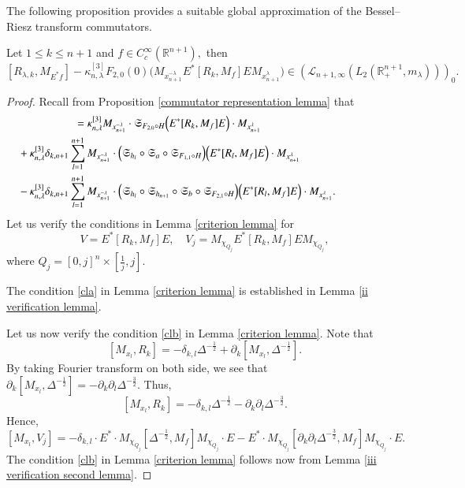 \documentclass[12pt]{amsart}
\begin{document}
The following proposition provides a suitable global approximation of the Bessel--Riesz transform commutators.
\begin{proposition}\label{first approximate lemma} Let $1\leq k\leq n+1$ and $f\in C^{\infty}_c(\mathbb{R}^{n+1}),$ then
$$[R_{\lambda,k},M_{E^{\ast}f}]-\kappa_{n,\lambda}^{[3]}F_{2,0}(0)\Big( M_{x_{n+1}^{-\lambda}} E^{\ast}[R_k,M_f]E M_{x_{n+1}^{\lambda}}\Big)\in (\mathcal{L}_{n+1,\infty}(L_2(\mathbb{R}^{n+1}_+,m_{\lambda})))_0.$$
\end{proposition}
\begin{proof} Recall from Proposition \ref{commutator representation lemma} that
\begin{align*}
[R_{\lambda,k},M_{E^{\ast}f}]&=\kappa_{n,\lambda}^{[3]}M_{x_{n+1}^{-\lambda}}\cdot\mathfrak{S}_{F_{2,0}\circ H}\Big(  E^{\ast}[R_k,M_{f}]E\Big)\cdot  M_{x_{n+1}^{\lambda}}\\
&\hspace{-1.8cm}+\kappa_{n,\lambda}^{[3]}\delta_{k,n+1}\sum_{l=1}^{n+1}M_{x_{n+1}^{-\lambda}} \cdot \Big(\mathfrak{S}_{h_l}\circ\mathfrak{S}_a\circ\mathfrak{S}_{F_{1,1}\circ H}\Big)\Big(E^{\ast}[R_l,M_{f}]E \Big)\cdot M_{x_{n+1}^{\lambda}}\\
&\hspace{-1.8cm}-\kappa_{n,\lambda}^{[3]}\delta_{k,n+1}\sum_{l=1}^{n+1} M_{x_{n+1}^{-\lambda}}\cdot\Big(\mathfrak{S}_{h_l}\circ\mathfrak{S}_{h_{n+1}}\circ\mathfrak{S}_b\circ\mathfrak{S}_{F_{2,1}\circ H}\Big)\Big( E^{\ast}[R_l,M_{f}]E\Big)\cdot  M_{x_{n+1}^{\lambda}}.
\end{align*}
Let us verify the conditions in Lemma \ref{criterion lemma} for
$$V=E^{\ast}[R_k,M_f]E,\quad V_j=M_{\chi_{Q_j}}E^{\ast}[R_k,M_f]EM_{\chi_{Q_j}},$$
where $Q_j=[0,j]^n\times[\frac1j,j].$

The condition \eqref{cla} in Lemma \ref{criterion lemma} is established in Lemma \ref{ii verification lemma}.

Let us now verify the condition \eqref{clb} in Lemma \ref{criterion lemma}. Note that
$$[M_{x_l},R_k]=-\delta_{k,l}\Delta^{-\frac12}+\partial_k[M_{x_l},\Delta^{-\frac12}].$$
By taking Fourier transform on both side, we see that $\partial_k[M_{x_l},\Delta^{-\frac12}]=-\partial_k\partial_l\Delta^{-\frac32}.$ Thus,
$$[M_{x_l},R_k]=-\delta_{k,l}\Delta^{-\frac12}-\partial_k\partial_l\Delta^{-\frac32}.$$
Hence,
$$[M_{x_l},V_j]=-\delta_{k,l}\cdot E^{\ast}\cdot M_{\chi_{Q_j}}[\Delta^{-\frac12},M_f]M_{\chi_{Q_j}}\cdot E-E^{\ast}\cdot M_{\chi_{Q_j}}[\partial_k\partial_l\Delta^{-\frac32},M_f]M_{\chi_{Q_j}}\cdot E.$$
The condition \eqref{clb} in Lemma \ref{criterion lemma} follows now from Lemma \ref{iii verification second lemma}.


\end{proof}
\end{document}
